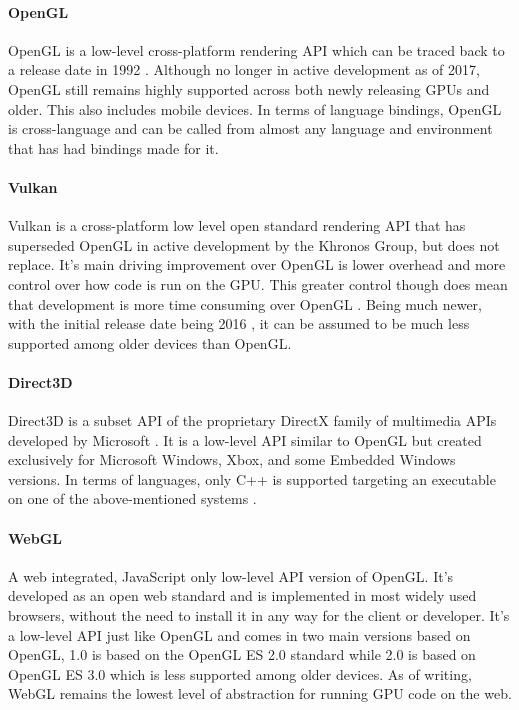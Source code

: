 \paragraph{OpenGL}
OpenGL is a low-level cross-platform rendering API which can be traced back to a release date in 1992 \cite[]{wiki:opengl}. Although no longer in active development as of 2017, OpenGL still remains highly supported across both newly releasing GPUs and older. This also includes mobile devices. In terms of language bindings, OpenGL is cross-language and can be called from almost any language and environment that has had bindings made for it. \cite[]{segal_2022_the}

\paragraph{Vulkan}
Vulkan is a cross-platform low level open standard rendering API that has superseded OpenGL in active development by the Khronos Group, but does not replace. It’s main driving improvement over OpenGL is lower overhead and more control over how code is run on the GPU. This greater control though does mean that development is more time consuming over OpenGL \cite[]{Vulkan}. Being much newer, with the initial release date being 2016 \cite[]{khronosgroup_2016_khronos}, it can be assumed to be much less supported among older devices than OpenGL.

\paragraph{Direct3D}
Direct3D is a subset API of the proprietary DirectX family of multimedia APIs developed by Microsoft \cite[]{grantmestrength_2021_direct3d}. It is a low-level API similar to OpenGL but created exclusively for Microsoft Windows, Xbox, and some Embedded Windows versions. In terms of languages, only C++ is supported targeting an executable on one of the above-mentioned systems \cite[]{stevewhims_2021_direct3d}.

\paragraph{WebGL}
A web integrated, JavaScript only low-level API version of OpenGL. It’s developed as an open web standard and is implemented in most widely used browsers, without the need to install it in any way for the client or developer. It’s a low-level API just like OpenGL and comes in two main versions based on OpenGL, 1.0 is based on the OpenGL ES 2.0 standard while 2.0 is based on OpenGL ES 3.0 which is less supported among older devices. As of writing, WebGL remains the lowest level of abstraction for running GPU code on the web. \cite[]{mozilla_2019_webgl} \cite[]{khronosgroup_2011_webgl}

